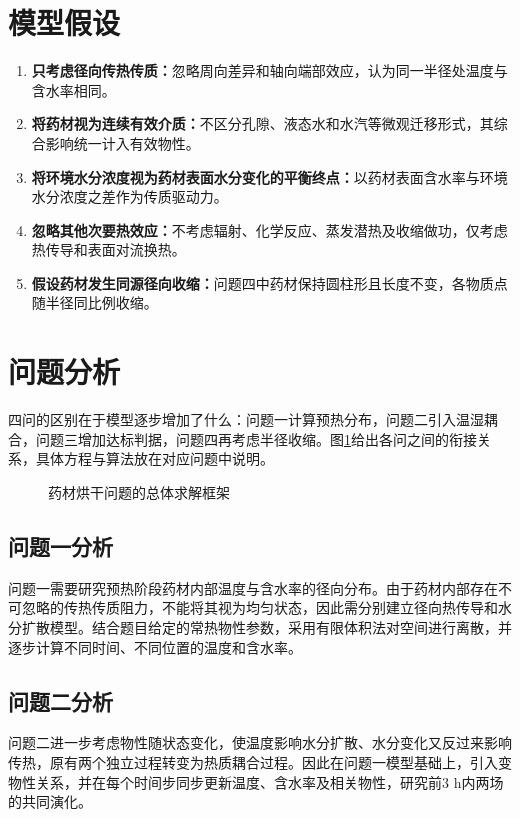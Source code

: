 \section{模型假设}
\begin{enumerate}[label=\arabic*、,ref=\arabic*,leftmargin=2em,labelsep=0pt,itemsep=0.5em,topsep=0.3em]
\item\label{assumption:radial} \textbf{只考虑径向传热传质：}忽略周向差异和轴向端部效应，认为同一半径处温度与含水率相同。
\item\label{assumption:continuum} \textbf{将药材视为连续有效介质：}不区分孔隙、液态水和水汽等微观迁移形式，其综合影响统一计入有效物性。
\item\label{assumption:equilibrium} \textbf{将环境水分浓度视为药材表面水分变化的平衡终点：}以药材表面含水率与环境水分浓度之差作为传质驱动力。
\item\label{assumption:sensible-heat} \textbf{忽略其他次要热效应：}不考虑辐射、化学反应、蒸发潜热及收缩做功，仅考虑热传导和表面对流换热。
\item\label{assumption:shrinkage} \textbf{假设药材发生同源径向收缩：}问题四中药材保持圆柱形且长度不变，各物质点随半径同比例收缩。
\end{enumerate}

\section{问题分析}
四问的区别在于模型逐步增加了什么：问题一计算预热分布，问题二引入温湿耦合，问题三增加达标判据，问题四再考虑半径收缩。图\ref{fig:framework}给出各问之间的衔接关系，具体方程与算法放在对应问题中说明。

\begin{figure}[!htbp]
\centering

\caption{药材烘干问题的总体求解框架}
\label{fig:framework}
\end{figure}

\subsection{问题一分析}
问题一需要研究预热阶段药材内部温度与含水率的径向分布。由于药材内部存在不可忽略的传热传质阻力，不能将其视为均匀状态，因此需分别建立径向热传导和水分扩散模型。结合题目给定的常热物性参数，采用有限体积法对空间进行离散，并逐步计算不同时间、不同位置的温度和含水率。

\subsection{问题二分析}
问题二进一步考虑物性随状态变化，使温度影响水分扩散、水分变化又反过来影响传热，原有两个独立过程转变为热质耦合过程。因此在问题一模型基础上，引入变物性关系，并在每个时间步同步更新温度、含水率及相关物性，研究前3 h内两场的共同演化。

